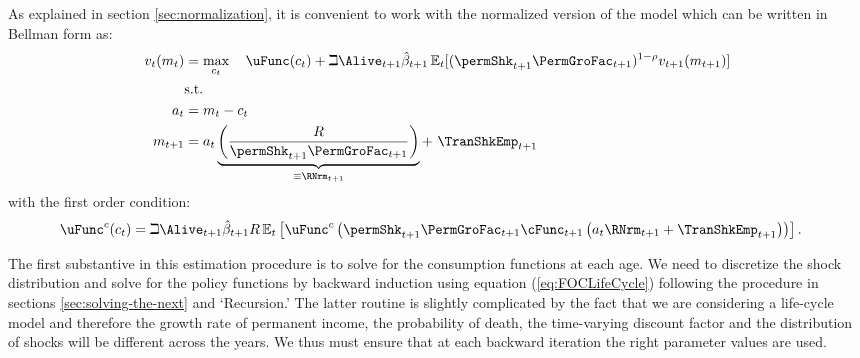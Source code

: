 As explained in section \ref{sec:normalization}, it is convenient to work with the normalized version of the model which can be written in Bellman form as:
  \begin{equation*}\begin{gathered}\begin{aligned}
        \vFunc_{\prd}(m_{\prd})  & = \max_{{c}_{\prd}}~~~ \uFunc(c_{\prd})+\beth\Alive_{\prd+1}\hat{\DiscFac}_{\prd+1}
        \Ex_{\prd}[(\permShk_{\prd+1}\PermGroFac_{\prd+1})^{1-\CRRA}\vFunc_{\prd+1}(m_{\prd+1})]   \\
        & \text{s.t.}   \nonumber \\
        a_{\prd}    & = m_{\prd}-c_{\prd} \nonumber
        \\      m_{\prd+1}  & = a_{\prd}\underbrace{\left(\frac{\Rfree}{\permShk_{\prd+1}\PermGroFac_{\prd+1}}\right)}_{\equiv \RNrm_{\prd+1}}+ ~\TranShkEmp_{\prd+1}
      \end{aligned}\end{gathered}\end{equation*}
with the first order condition:
  \begin{equation}\begin{gathered}\begin{aligned}
        \uFunc^{c}(c_{\prd}) & = \beth\Alive_{\prd+1}\hat{\DiscFac}_{\prd+1}\Rfree \Ex_{\prd}\left[\uFunc^{c}\left(\permShk_{\prd+1}\PermGroFac_{\prd+1}\cFunc_{\prd+1}\left(a_{\prd}\RNrm_{\prd+1}+\TranShkEmp_{\prd+1}\right)\right)\right]\label{eq:FOCLifeCycle}
        .
      \end{aligned}\end{gathered}\end{equation}

The first substantive {\move} in this estimation procedure is
to solve for the consumption functions at each age. We need to
discretize the shock distribution and solve for the policy
functions by backward induction using equation (\ref{eq:FOCLifeCycle})
following the procedure in sections \ref{sec:solving-the-next} and
`Recursion.' The latter routine
is slightly complicated by the fact that we are considering a
life-cycle model and therefore the growth rate of permanent income,
the probability of death, the time-varying discount factor and the
distribution of shocks will be different across the years. We thus
must ensure that at each backward iteration the right parameter
values are used.

